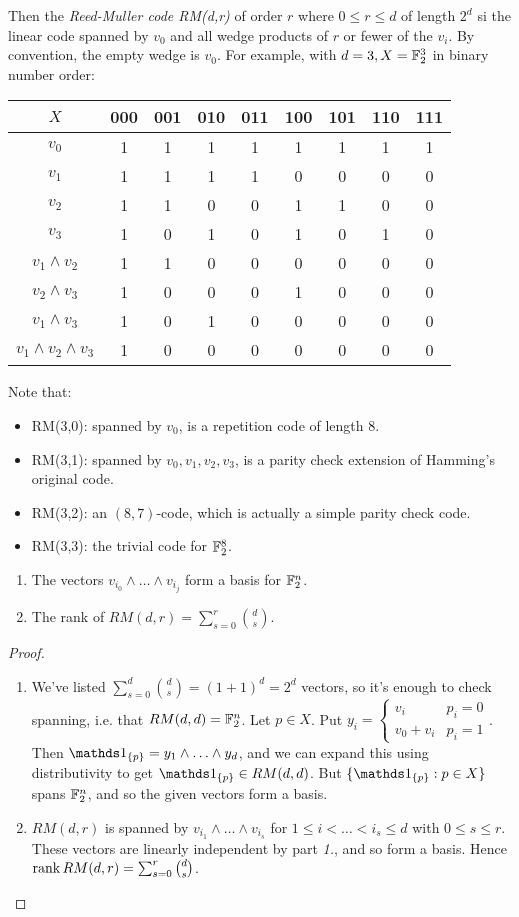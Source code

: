 \documentclass[10pt,a4paper]{article}
\begin{document}
Then the \emph{Reed-Muller code RM(d,r)} of order $r$ where $0\leq r\leq d$ of length $2^d$ si the linear code spanned by $v_0$ and all wedge products of $r$ or fewer of the $v_i$. By convention, the empty wedge is $v_0$. For example, with $d = 3, X = \mathbb{F}_2^3$ in binary number order:
\begin{center}
\begin{tabular}{c|cccccccc}
$X$&000&001&010&011&100&101&110&111\\\hline
$v_0$&1&1&1&1&1&1&1&1\\
$v_1$&1&1&1&1&0&0&0&0\\
$v_2$&1&1&0&0&1&1&0&0\\
$v_3$&1&0&1&0&1&0&1&0\\
$v_1\wedge v_2$&1&1&0&0&0&0&0&0\\
$v_2\wedge v_3$&1&0&0&0&1&0&0&0\\
$v_1\wedge v_3$&1&0&1&0&0&0&0&0\\
$v_1\wedge v_2\wedge v_3$&1&0&0&0&0&0&0&0
\end{tabular}
\end{center}
Note that:
\begin{itemize}
\item RM(3,0): spanned by $v_0$, is a repetition code of length 8.
\item RM(3,1): spanned by $v_0,v_1,v_2,v_3$, is a parity check extension of Hamming's original code.
\item RM(3,2): an $(8,7)$-code, which is actually a simple parity check code.
\item RM(3,3): the trivial code for $\mathbb{F}_2^8$.
\end{itemize}
\begin{theorem}
\item
\begin{enumerate}
\item The vectors $v_{i_0} \wedge \ldots \wedge v_{i_j}$ form a basis for $\mathbb{F}_2^n$.
\item The rank of $RM(d,r) = \sum_{s=0}^r \binom{d}{s}$.
\end{enumerate}
\end{theorem}
\begin{proof}
\item
\begin{enumerate}
\item We've listed $\sum_{s=0}^d \binom{d}{s} = (1+1)^d = 2^d$ vectors, so it's enough to check spanning, i.e. that $RM(d,d) = \mathbb{F}_2^n$. Let $p \in X$. Put $y_i = \begin{cases} v_i & p_i=0\\ v_0+v_i & p_i=1\end{cases}$. Then $\one_{\{p\}} = y_1 \wedge \ldots \wedge y_d$, and we can expand this using distributivity to get $\one_{\{p\}} \in RM(d,d)$. But $\{\one_{\{p\}} : p \in X\}$ spans $\mathbb{F}_2^n$, and so the given vectors form a basis.
\item $RM(d,r)$ is spanned by $v_{i_1} \wedge \ldots \wedge v_{i_s}$ for $1 \leq i < \ldots <i_s \leq d$ with $0 \leq s \leq r$. These vectors are linearly independent by part \textit{1.}, and so form a basis. Hence $\operatorname{rank} RM(d, r) = \sum_{s=0}^r \binom{d}{s}$.
\end{enumerate}
\end{proof}
\end{document}
